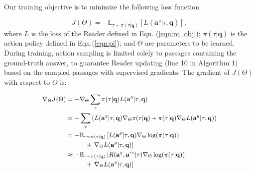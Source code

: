 \documentclass[letterpaper]{article} %
\begin{document}
\begin{comment}
\begin{equation}
J(\theta)=
-\mathbb{E}_{\tau  \sim \pi (\tau |\theta^r ))} \left(r + \text{log} (\mathbf{\beta}^\text{s}_{a^s_\tau }) +
\text{log} (\mathbf{\beta}^\text{e}_{a^e_\tau }) \right)
\end{equation}
\end{comment}

Our training objective is to minimize the following loss function

\begin{equation}
J(\Theta)=
-\mathbb{E}_{\tau  \sim \pi (\tau | \mathbf{q} )} \left[ L(\mathbf{a}^g|\tau, \mathbf{q})\right],
\end{equation}
where $L$ is the loss of the Reader defined in Eqn. (\ref{eqn:rc_obj}); $\pi (\tau | \mathbf{q})$ is the action policy %
defined in Eqn.(\ref{eqn:pi});  and $\Theta$ are parameters to be learned.
During training, action sampling %
is limited solely to passages containing the ground-truth answer, to guarantee Reader updating (line 10 in Algorithm 1) based on the sampled passages with supervised gradients. %
The gradient of $J(\Theta)$ with respect to $\Theta$ is: 


\begin{equation}
\small
\begin{split}
\nabla_{\Theta}  J(\Theta) 
&= -\nabla_{\Theta} \sum_{\tau}  \pi(\tau|\mathbf{q}) L (\mathbf{a}^g | \tau, \mathbf{q}) \\
&=  - \sum_{\tau} \left( L(\mathbf{a}^g | \tau, \mathbf{q}) \nabla_{\Theta} \pi(\tau|\mathbf{q})  + \pi(\tau|\mathbf{q}) \nabla_{\Theta} L (\mathbf{a}^g | \tau, \mathbf{q}) \right) \\
&= - \mathbb{E}_{\tau  \sim \pi(\tau|\mathbf{q})}\left[ L (\mathbf{a}^g | \tau, \mathbf{q}) \nabla_{\Theta}\log(\pi(\tau|\mathbf{q})) \right. \\
&\quad\quad\quad + \left. \nabla_{\Theta} L (\mathbf{a}^g | \tau, \mathbf{q}) \right]\\
&\approx - \mathbb{E}_{\tau  \sim \pi(\tau|\mathbf{q})}\left[ R (\mathbf{a}^g,\mathbf{a}^{rc} | \tau) \nabla_{\Theta} \log(\pi(\tau|\mathbf{q})) \right. \\
&\quad \quad \quad + \left. \nabla_{\Theta} L (\mathbf{a}^g | \tau, \mathbf{q}) \right]
\label{eqn:rl_obj}
\end{split}
\normalsize
\end{equation}
\end{document}
